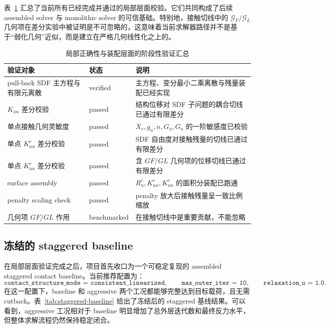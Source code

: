 \documentclass[12pt,a4paper]{ctexart}
\numberwithin{equation}{section}
\begin{document}
表~\ref{tab:local-verification} 汇总了当前所有已经完成并通过的局部层面校验。它们共同构成了后续 assembled solver 与 monolithic solver 的可信基础。特别地，接触切线中的 $\bm{\mathcal G}_F/\bm{\mathcal G}_L$ 几何项在差分实验中被证明是不可忽略的，这意味着当前求解器路径并不是基于“弱化几何”近似，而是建立在严格几何线性化之上的。

\begin{table}[H]
\centering
\caption{局部正确性与装配层面的阶段性验证汇总}
\label{tab:local-verification}
\small
\begin{tabular}{p{5.0cm} p{3.0cm} p{6.8cm}}
\toprule
验证对象 & 状态 & 说明 \\
\midrule
pull-back SDF 主方程与有限元离散 & verified & 主方程、变分最小二乘离散与残量装配已经实现 \\
$K_{\phi u}$ 差分校验 & passed & 结构位移对 SDF 子问题的耦合切线已通过有限差分 \\
单点接触几何灵敏度 & passed & $X_c,g_n,n,G_u,G_a$ 的一阶敏感度已校验 \\
单点 $K_{u\phi}^c$ 差分校验 & passed & SDF 自由度对接触残量的切线已通过有限差分 \\
单点 $K_{uu}^c$ 差分校验 & passed & 含 $GF/GL$ 几何项的位移切线已通过有限差分 \\
surface assembly & passed & $R_u^c, K_{u\phi}^c, K_{uu}^c$ 的面积分装配已跑通 \\
penalty scaling check & passed & penalty 放大后接触残量呈一致比例缩放 \\
几何项 $GF/GL$ 作用 & benchmarked & 在接触切线中是重要贡献，不能忽略 \\
\bottomrule
\end{tabular}
\end{table}

\subsection{冻结的 staggered baseline}

在局部层面验证完成之后，项目首先收口为一个可稳定复现的 assembled staggered contact baseline。当前推荐配置为：
\begin{equation*}
\texttt{contact\_structure\_mode = consistent\_linearized},\qquad
\texttt{max\_outer\_iter = 10},\qquad
\texttt{relaxation\_u = 1.0}.
\end{equation*}
在这一配置下，baseline 和 aggressive 两个工况都能够完整达到目标载荷，且无需 cutback。表~\ref{tab:staggered-baseline} 给出了冻结后的 staggered 基线结果。可以看到，aggressive 工况相对于 baseline 明显增加了总外层迭代数和最终反力水平，但整体求解流程仍然保持稳定闭合。
\end{document}
